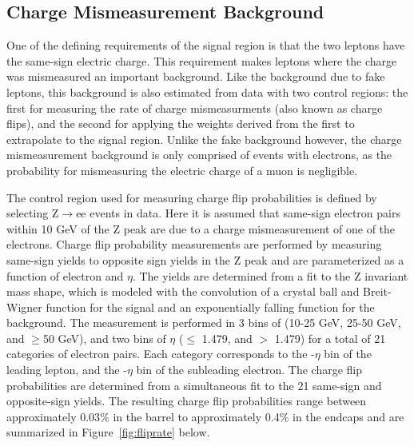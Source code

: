 \subsection{Charge Mismeasurement Background}
One of the defining requirements of the signal region is that the two leptons have the same-sign electric charge. This requirement makes leptons where the charge was mismeasured an important background. Like the background due to fake leptons,
this background is also estimated from data with two control regions: the first for measuring the rate of charge mismeasurments (also known as charge flips), and the second for applying the weights derived from the first to extrapolate to
the signal region. Unlike the fake background however, the charge mismeasurement background is only comprised of events with electrons, as the probability for mismeasuring the electric charge of a muon is negligible.

The control region used for measuring charge flip probabilities is defined by selecting Z$\rightarrow$ee events in data. Here it is assumed that same-sign electron pairs within 10 GeV of the Z peak are due to a charge mismeasurement of one of
the electrons. Charge flip probability measurements are performed by measuring same-sign yields to opposite sign yields in the Z peak and are parameterized as a function of electron \pt and $\eta$.
The yields are determined from a fit to the Z invariant mass shape, which is modeled with the convolution of a crystal ball and Breit-Wigner function for the signal and an exponentially falling function for the background. 
The measurement is performed in 3 bins of \pt (10-25 GeV, 25-50 GeV, and $\geq$50 GeV), and two bins of $\eta$ ($\leq$ 1.479, and $>$ 1.479) for a total of 21 categories of electron pairs. Each category corresponds to the \pt-$\eta$ bin
of the leading lepton, and the \pt-$\eta$ bin of the subleading electron.  
The charge flip probabilities are determined from a simultaneous fit to the 21 same-sign and opposite-sign yields. The resulting charge flip probabilities range between approximately 0.03$\%$ in the barrel
to approximately 0.4$\%$ in the endcaps and are summarized in Figure~\ref{fig:fliprate} below.

